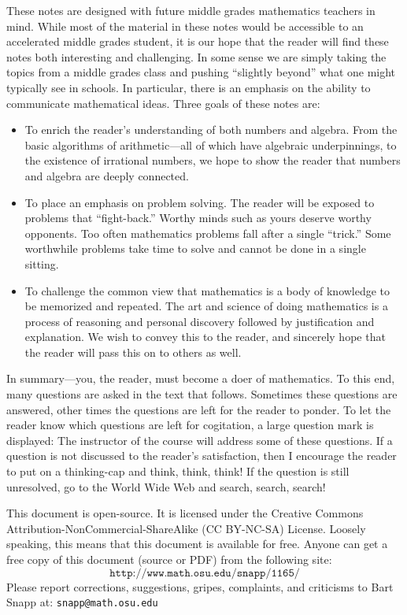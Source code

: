 These notes are designed with future middle grades mathematics
teachers in mind.  While most of the material in these notes would be
accessible to an accelerated middle grades student, it is our hope
that the reader will find these notes both interesting and
challenging.  In some sense we are simply taking the topics from a
middle grades class and pushing ``slightly beyond'' what one might
typically see in schools. In particular, there is an emphasis on the
ability to communicate mathematical ideas.  Three goals of these notes
are:
\begin{itemize}
\item To enrich the reader's understanding of both numbers and algebra. 
From the basic algorithms of arithmetic---all of which have algebraic
underpinnings, to the existence of irrational numbers, we hope to show
the reader that numbers and algebra are deeply connected.
\item To place an emphasis on problem solving. The reader will be exposed 
to problems that ``fight-back.'' Worthy minds such as yours deserve
worthy opponents. Too often mathematics problems fall after a single
``trick.'' Some worthwhile problems take time to solve and cannot be done
in a single sitting.
\item To challenge the common view that mathematics is a body of knowledge 
to be memorized and repeated. The art and science of doing mathematics
is a process of reasoning and personal discovery followed by
justification and explanation. We wish to convey this to the reader,
and sincerely hope that the reader will pass this on to others as
well.
\end{itemize}
In summary---you, the reader, must become a doer of mathematics.  To
this end, many questions are asked in the text that follows. Sometimes
these questions are answered, other times the questions are left for
the reader to ponder. To let the reader know which questions are left
for cogitation, a large question mark is displayed:
\QM
The instructor of the course will address some of these questions. If
a question is not discussed to the reader's satisfaction, then I
encourage the reader to put on a thinking-cap and think, think, think!
If the question is still unresolved, go to the World Wide Web and
search, search, search!

This document is open-source. It is licensed under the Creative
Commons Attribution-NonCommercial-ShareAlike (CC BY-NC-SA)
License. Loosely speaking, this means that this document is available
for free. Anyone can get a free copy of this document (source or PDF)
from the following site:
\[
\texttt{http://www.math.osu.edu/\~{}snapp/1165/}
\]
Please report corrections, suggestions, gripes, complaints, and
criticisms to Bart Snapp at: \texttt{snapp@math.osu.edu}


